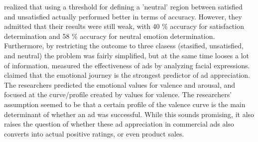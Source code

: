 \citet{Kamaruddin:2016:MeasuringCustomerSatisfaction} realized that using a threshold for defining a 'neutral' region between satisfied and unsatisfied actually performed better in terms of accuracy. However, they admitted that their results were still weak, with 40 \% accuracy for satisfaction determination and 58 \% accuracy for neutral emotion determination. Furthermore, by restricting the outcome to three clasess (stasified, unsatisfied, and neutral) the problem was fairly simplified, but at the same time looses a lot of information.
\newline\newline
\citet{Poirier:2016:AdsFacialExpression} measured the effectiveness of ads by analyzing facial expressions. \citet{Poirier:2016:AdsFacialExpression} claimed that the emotional journey is the strongest predictor of ad appreciation. The researchers predicted the emotional values for valence and arousal, and focused at the curve/profile created by values for valence. The researchers' assumption seemed to be that a certain profile of the valence curve is the main determinant of whether an ad was successful. While this sounds promising, it also raises the question of whether these ad appreciation in commercial ads also converts into actual positive ratings, or even product sales.
